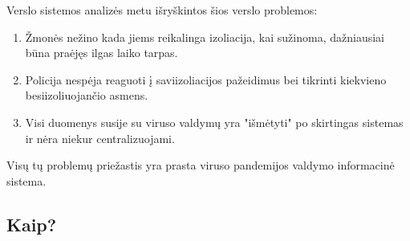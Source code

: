 \documentclass{VUMIFPSkursinis}
\begin{document}
Verslo sistemos analizės metu išryškintos šios verslo problemos:
\begin{enumerate}
	\item Žmonės nežino kada jiems reikalinga izoliacija, kai sužinoma, dažniausiai būna praėjęs ilgas laiko tarpas.
	\item Policija nespėja reaguoti į saviizoliacijos pažeidimus bei tikrinti kiekvieno besiizoliuojančio asmens.
	\item Visi duomenys susije su viruso valdymų yra "išmėtyti" po skirtingas sistemas ir nėra niekur centralizuojami.
\end{enumerate}

Visų tų problemų priežastis yra prasta viruso pandemijos valdymo informacinė sistema.

\subsection{Kaip?}
\end{document}
